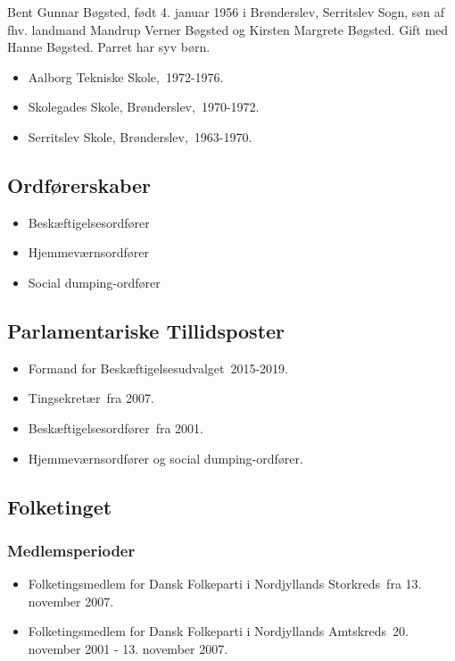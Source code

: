 \documentclass[11pt, a4paper]{awesome-cv}
\begin{document}
\makecvheader[R]
\makelettertitle
\begin{cvletter}
Bent Gunnar Bøgsted, født 4. januar 1956 i Brønderslev, Serritslev Sogn, søn af fhv. landmand Mandrup Verner Bøgsted og Kirsten Margrete Bøgsted. Gift med Hanne Bøgsted. Parret har syv børn.

\begin{itemize}
\item Aalborg Tekniske Skole, 1972-1976.
\item Skolegades Skole, Brønderslev, 1970-1972.
\item Serritslev Skole, Brønderslev, 1963-1970.
\end{itemize}
\subsection*{Ordførerskaber}
\begin{itemize}
\item Beskæftigelsesordfører
\item Hjemmeværnsordfører
\item Social dumping-ordfører
\end{itemize}
\subsection*{Parlamentariske Tillidsposter}
\begin{itemize}
\item Formand for Beskæftigelsesudvalget 2015-2019.
\item Tingsekretær fra 2007.
\item Beskæftigelsesordfører fra 2001.
\item Hjemmeværnsordfører og social dumping-ordfører.
\end{itemize}
\subsection*{Folketinget}
\subsubsection*{Medlemsperioder}
\begin{itemize}
\item Folketingsmedlem for Dansk Folkeparti i Nordjyllands Storkreds fra 13. november 2007.
\item Folketingsmedlem for Dansk Folkeparti i Nordjyllands Amtskreds 20. november 2001 - 13. november 2007.
\end{itemize}

\end{cvletter}
\end{document}
